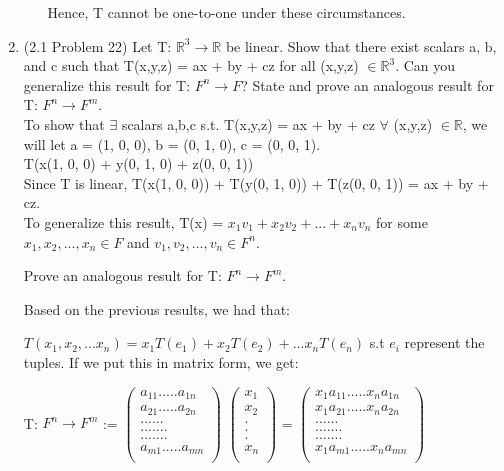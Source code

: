 \documentclass[12pt]{article}
\begin{document}
\begin{enumerate}
\begin{enumerate}[label=(\alph*)]
            Hence, T cannot be one-to-one under these circumstances. \qedsymbol{}
            
        \end{enumerate}
    
    \item (2.1 Problem 22)
    Let T: $\mathbb{R}^3 \xrightarrow{} \mathbb{R}$ be linear. Show that there exist scalars a, b, and c such that T(x,y,z) = ax + by + cz for all (x,y,z) $\in \mathbb{R}^3$. Can you generalize this result for T: $F^n \xrightarrow{} F$? State and prove an analogous result for T: $F^n \xrightarrow{} F^m$. \\

    To show that $\exists$ scalars a,b,c s.t. T(x,y,z) = ax + by + cz $\forall$ (x,y,z) $\in \mathbb{R}$, we will let a = (1, 0, 0), b = (0, 1, 0), c = (0, 0, 1). \\
    T(x(1, 0, 0) + y(0, 1, 0) + z(0, 0, 1)) \\
    Since T is linear, T(x(1, 0, 0)) + T(y(0, 1, 0)) + T(z(0, 0, 1)) = ax + by + cz. \\

    To generalize this result, T(x) = $x_1v_1 + x_2v_2 + ... + x_nv_n$ for some $x_1, x_2, ..., x_n \in F$ and $v_1, v_2, ..., v_n \in F^n$. 

    Prove an analogous result for T: $F^n \xrightarrow{} F^m$.

    Based on the previous results, we had that: 

    $T(x_1, x_2, ... x_n) = x_1T(e_1) + x_2T(e_2) + ... x_nT(e_n)$ s.t $e_i$ represent the tuples. If we put this in matrix form, we get:
    

    T: $F^n \rightarrow F^m$ := $\begin{pmatrix}
    a_{11} ..... a_{1n}\\
    a_{21} ..... a_{2n}\\
    . .....\\
    ....... \\
    ....... \\
    a_{m1}.....a_{mn}\\
    \end{pmatrix}$    
  $  \begin{pmatrix}
    x_1 \\
    x_2 \\
    . \\
    . \\
    . \\
    x_n \\
    \end{pmatrix}$
    = 
    $\begin{pmatrix}
    x_1a_{11} ..... x_na_{1n}\\
    x_1a_{21} ..... x_na_{2n}\\
    . .....\\
    ....... \\
    ....... \\
    x_1a_{m1}.....x_na_{mn}\\
    \end{pmatrix}$ 


\end{enumerate}
\end{document}
